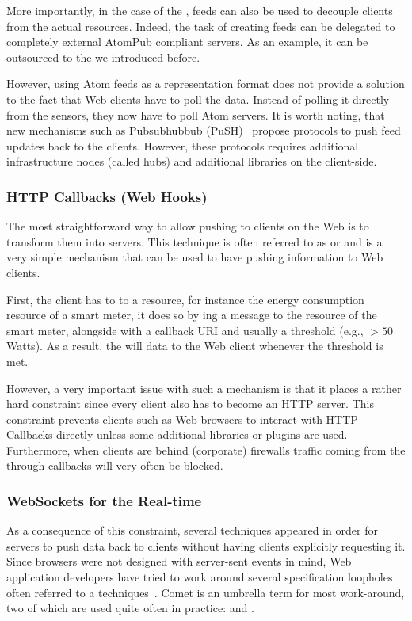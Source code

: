 More importantly, in the case of the \WoT{}, feeds can also be used to decouple clients from the actual resources. Indeed, the task of creating feeds can be delegated to completely external AtomPub compliant servers. As an example, it can be outsourced to the \sgs{} we introduced before.

However, using Atom feeds as a representation format does not provide a solution to the fact that Web clients have to poll the data. Instead of polling it directly from the sensors, they now have to poll Atom servers. It is worth noting, that new mechanisms such as Pubsubhubbub (PuSH)~ propose protocols to push feed updates back to the clients. However, these protocols requires additional infrastructure nodes (called hubs) and additional libraries on the client-side.



\subsubsection{HTTP Callbacks (Web Hooks)}

The most straightforward way to allow pushing to clients on the Web is to transform them into servers. This technique is often referred to as  or  and is a very simple mechanism that can be used to have \sts{} pushing information to Web clients.

First, the client has to  to a resource, for instance the energy consumption resource of a smart meter, it does so by ing a message to the  resource of the smart meter, alongside with a callback URI and usually a threshold (e.g., $> 50$ Watts). As a result, the \sts{} will  data to the Web client whenever the threshold is met.

However, a very important issue with such a mechanism is that it places a rather hard constraint since every client also has to become an HTTP server. This constraint prevents clients such as Web browsers to interact with HTTP Callbacks directly unless some additional libraries or plugins are used. Furthermore, when clients are behind (corporate) firewalls traffic coming from the \sts{} through callbacks will very often be blocked.


\subsubsection{WebSockets for the Real-time \WoT{}}\label{real-time-and-tpusher}
As a consequence of this constraint, several techniques appeared in order for servers to push data back to clients without having clients explicitly requesting it. Since browsers were not designed with server-sent events in mind, Web application developers have tried to work around several specification loopholes often referred to a  techniques~. Comet is an umbrella term for most work-around, two of which are used quite often in practice:  and .

